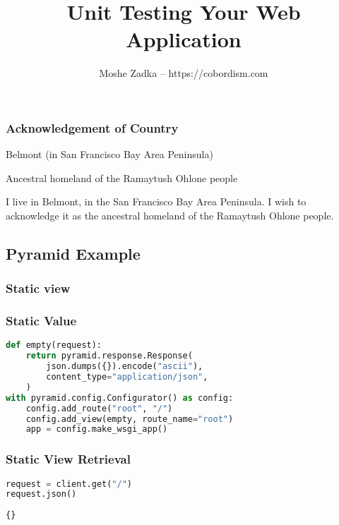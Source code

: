 \documentclass[ignorenonframetext]{beamer}
\title{Unit Testing Your Web Application}
\author{Moshe Zadka -- https://cobordism.com}
\date{}
\begin{document}
\begin{titlepage}
\maketitle
\end{titlepage}

\frame{\titlepage}

\begin{frame}
\frametitle{Acknowledgement of Country}

Belmont (in San Francisco Bay Area Peninsula)

Ancestral homeland of the Ramaytush Ohlone people

\end{frame}

I live in Belmont, in the San Francisco Bay Area Peninsula. I wish to
acknowledge it as the ancestral homeland of the Ramaytush Ohlone people.

\hypertarget{pyramid-example}{%
\subsection{Pyramid Example}\label{pyramid-example}}

\hypertarget{static-view}{%
\subsubsection{Static view}\label{static-view}}

\begin{frame}[fragile]
\frametitle{Static Value}

\begin{lstlisting}[language=Python]
def empty(request):
    return pyramid.response.Response(
        json.dumps({}).encode("ascii"),
        content_type="application/json",
    )
with pyramid.config.Configurator() as config:
    config.add_route("root", "/")
    config.add_view(empty, route_name="root")
    app = config.make_wsgi_app()
\end{lstlisting}

\end{frame}

\begin{frame}[fragile]
\frametitle{Static View Retrieval}

\begin{lstlisting}[language=Python]
request = client.get("/")
request.json()
\end{lstlisting}

\begin{lstlisting}
{}
\end{lstlisting}

\end{frame}
\end{document}
